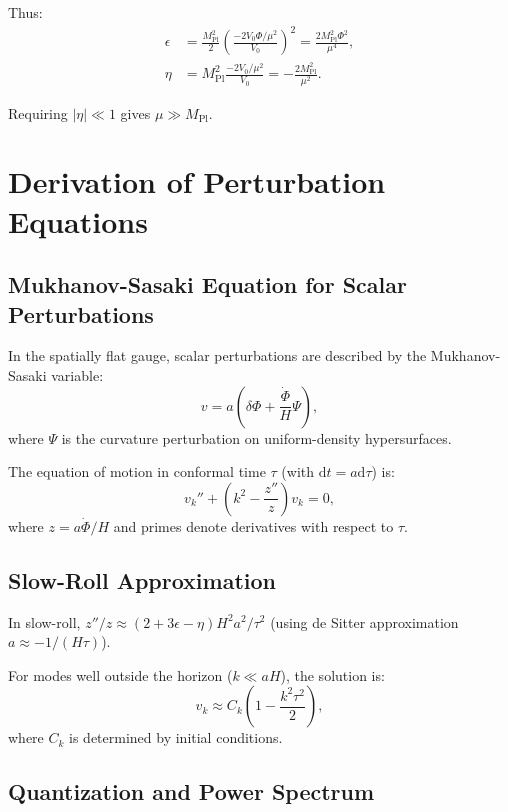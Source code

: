 \documentclass[11pt,a4paper]{article}
\numberwithin{equation}{section}
\theoremstyle{plain}
\theoremstyle{definition}
\theoremstyle{remark}
\newcommand{\dd}{\mathrm{d}}
\begin{document}
Thus:
\begin{align}
\epsilon &= \frac{M_{\mathrm{Pl}}^2}{2}\left(\frac{-2V_0\Phi/\mu^2}{V_0}\right)^2 = \frac{2M_{\mathrm{Pl}}^2\Phi^2}{\mu^4},\\
\eta &= M_{\mathrm{Pl}}^2\frac{-2V_0/\mu^2}{V_0} = -\frac{2M_{\mathrm{Pl}}^2}{\mu^2}.
\end{align}

Requiring $|\eta| \ll 1$ gives $\mu \gg M_{\mathrm{Pl}}$.

\section{Derivation of Perturbation Equations}
\label{app:pert}

\subsection{Mukhanov-Sasaki Equation for Scalar Perturbations}

In the spatially flat gauge, scalar perturbations are described by the Mukhanov-Sasaki variable:
\begin{equation}
v = a\left(\delta\Phi + \frac{\dot{\Phi}}{H}\Psi\right),
\end{equation}
where $\Psi$ is the curvature perturbation on uniform-density hypersurfaces.

The equation of motion in conformal time $\tau$ (with $\dd t = a\dd\tau$) is:
\begin{equation}
v_k'' + \left(k^2 - \frac{z''}{z}\right)v_k = 0,
\label{eq:MS-equation}
\end{equation}
where $z = a\dot{\Phi}/H$ and primes denote derivatives with respect to $\tau$.

\subsection{Slow-Roll Approximation}

In slow-roll, $z''/z \approx (2 + 3\epsilon - \eta)H^2a^2/\tau^2$ (using de Sitter approximation $a \approx -1/(H\tau)$).

For modes well outside the horizon ($k \ll aH$), the solution is:
\begin{equation}
v_k \approx C_k\left(1 - \frac{k^2\tau^2}{2}\right),
\end{equation}
where $C_k$ is determined by initial conditions.

\subsection{Quantization and Power Spectrum}
\end{document}
